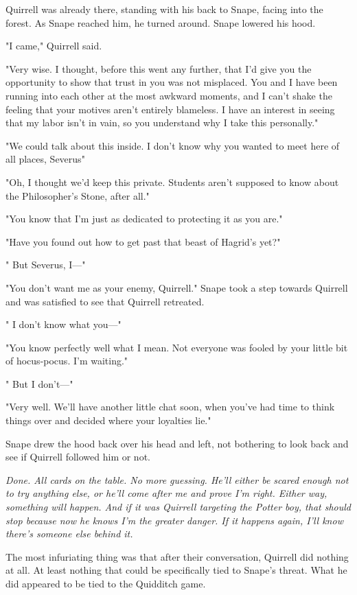 Quirrell was already there, standing with his back to Snape, facing into the forest. As Snape reached him, he turned around. Snape lowered his hood.

"I came," Quirrell said.

"Very wise. I thought, before this went any further, that I'd give you the opportunity to show that trust in you was not misplaced. You and I have been running into each other at the most awkward moments, and I can't shake the feeling that your motives aren't entirely blameless. I have an interest in seeing that my labor isn't in vain, so you understand why I take this personally."

"We could{\el} talk about this inside. I{\el} don't know why you wanted{\el} to meet here of all{\el} places, Severus{\el}"

"Oh, I thought we'd keep this private. Students aren't supposed to know about the Philosopher's Stone, after all."

"You know that I'm{\el} just as dedicated to{\el} protecting it as{\el} you are."

"Have you found out how to get past that beast of Hagrid's yet?"

"{\el} But Severus, I—"

"You don't want me as your enemy, Quirrell." Snape took a step towards Quirrell and was satisfied to see that Quirrell retreated.

"{\el} I don't know what you—"

"You know perfectly well what I mean. Not everyone was fooled by your little bit of hocus-pocus. I'm waiting."

"{\el} But I{\el} don't—"

"Very well. We'll have another little chat soon, when you've had time to think things over and decided where your loyalties lie."

Snape drew the hood back over his head and left, not bothering to look back and see if Quirrell followed him or not.

\emph{Done. All cards on the table. No more guessing. He'll either be scared enough not to try anything else, or he'll come after me and prove I'm right. Either way, something will happen. And if it was Quirrell targeting the Potter boy, that should stop because now he knows I'm the greater danger. If it happens again, I'll know there's someone else behind it.}

The most infuriating thing was that after their conversation, Quirrell did nothing at all. At least nothing that could be specifically tied to Snape's threat. What he did appeared to be tied to the Quidditch game.

